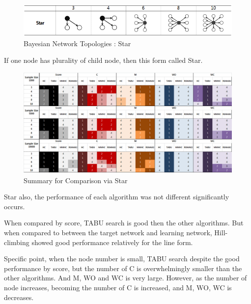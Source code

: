	\begin{figure}[h]
	\centering
		\includegraphics[height=50pt]{images/Topologies_Star}
		\caption{Bayesian Network Topologies : Star}
	\end{figure}	
	
	If one node has plurality of child node, then this form called Star.

\begin{figure}[!bhp]
	\centering
		\includegraphics[height=155pt]{images/Result_Star}
		\caption{Summary for Comparison via Star}
	\end{figure}	

Star also, the performance of each algorithm was not different significantly occurs.

When compared by score, TABU search is good then the other algorithms. But when compared to between the target network and learning network, Hill-climbing showed good performance relatively for the line form.

Specific point, when the node number is small, TABU search despite the good performance by score, but the number of C is overwhelmingly smaller than the other algorithms. And M, WO and WC is very large. However, as the number of node increases, becoming the number of C is increased, and M, WO, WC is decreases.

